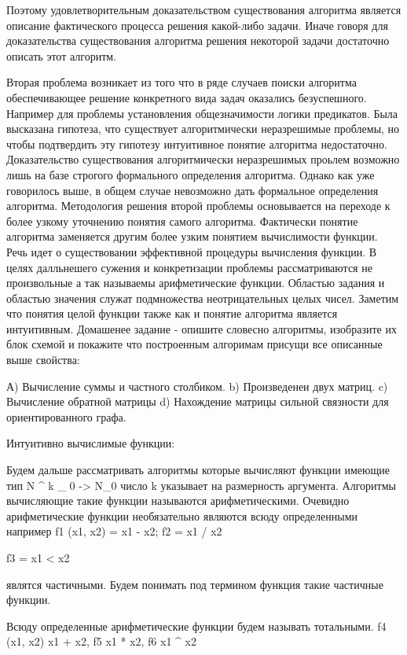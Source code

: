 Поэтому удовлетворительным доказательством существования алгоритма является описание фактического процесса решения какой-либо задачи.
Иначе говоря для доказательства существования алгоритма решения некоторой задачи достаточно описать этот алгоритм.

Вторая проблема возникает из того что в ряде случаев поиски алгоритма обеспечивающее решение конкретного вида задач оказались безуспешного. Например для проблемы установления общезначимости логики предикатов. Была высказана гипотеза, что существует алгоритмически неразрешимые проблемы, но чтобы подтвердить эту гипотезу интуитивное понятие алгоритма недостаточно. Доказательство существования алгоритмически неразрешимых проьлем возможно лишь на базе строгого формального определения алгоритма. Однако как уже говорилось выше, в общем случае невозможно дать формальное определения алгоритма. Методология решения второй проблемы основывается на переходе к более узкому уточнению понятия самого алгоритма. Фактически понятие алгоритма заменяется другим более узким понятием вычислимости функции. Речь идет о существовании эффективной процедуры вычисления функции. В целях далльнешего сужения и конкретизации проблемы рассматриваются не произвольные а так называемы арифметические функции. Областью задания и областью значения служат подмножества неотрицательных целых чисел. Заметим что понятия целой функции также как и понятие алгоритма является интуитивным. Домашенее задание - опишите словесно алгоритмы, изобразите их блок схемой и покажите что построенным алгоримам присущи все описанные выше свойства:

А) Вычисление суммы и частного столбиком.
b) Произведенеи двух матриц.
c) Вычисление обратной матрицы
d) Нахождение матрицы сильной связности для ориентированного графа.

Интуитивно вычислимые функции:

Будем дальше рассматривать алгоритмы которые вычисляют функции имеющие тип N ^ k _ 0 -> N_0
число k указывает на размерность аргумента. Алгоритмы вычисляющие такие функции называются арифметическими. Очевидно арифметические функции необязательно являются всюду определенными например f1 (x1, x2) = x1 - x2;
f2 = x1 / x2

f3  = x1 < x2

являтся частичными. Будем понимать под термином функция такие частичные функции.

Всюду определенные арифметические функции будем называть тотальными. f4 (x1, x2) x1 + x2, f5 x1 * x2, f6 x1 ^ x2

